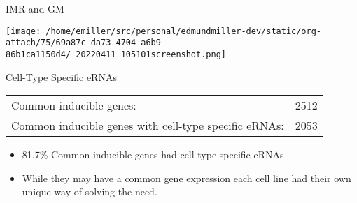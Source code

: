 \documentclass[bigger]{beamer}
\begin{document}
\begin{frame}[label={sec:org2c4b34f}]{IMR and GM}
\begin{center}
\texttt{[image: /home/emiller/src/personal/edmundmiller-dev/static/org-attach/75/69a87c-da73-4704-a6b9-86b1ca1150d4/\_20220411\_105101screenshot.png]}
\end{center}
\end{frame}
\begin{frame}[label={sec:orgef26d4e}]{Cell-Type Specific eRNAs}
\begin{center}
\begin{tabular}{lr}
Common inducible genes: & 2512\\
Common inducible genes with cell-type specific eRNAs: & 2053\\
\end{tabular}
\end{center}

\begin{itemize}
\item 81.7\%  Common inducible genes had \alert{cell-type} specific eRNAs
\item While they may have a common gene expression each cell line had their own
unique way of solving the need.
\end{itemize}
\end{frame}
\end{document}
